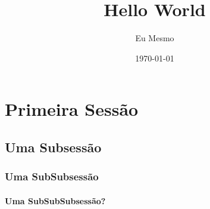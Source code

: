 \documentclass[journal,compsoc]{IEEEtran}
\begin{document}
\title{Hello World}
\date{\today}
\author{Eu Mesmo}
\maketitle

\section{Primeira Sessão}
\lipsum[1]

\subsection{Uma Subsessão}
\lipsum[2]

\subsubsection{Uma SubSubsessão}
\lipsum[3]

\paragraph{Uma SubSubSubsessão?}
\lipsum[4]
\end{document}
